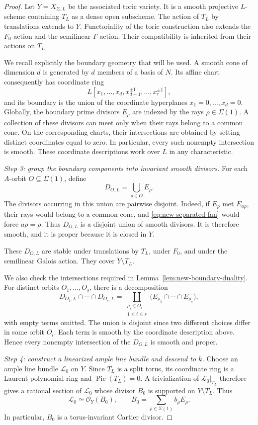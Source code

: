 \documentclass[11pt,reqno]{amsart}
\theoremstyle{definition}
\theoremstyle{remark}
\theoremstyle{plain}
\numberwithin{equation}{section}
\begin{document}
\begin{proof}
Let \(Y=X_{\Sigma,L}\) be the associated toric variety.
It is a smooth projective \(L\)-scheme containing \(T_L\) as
a dense open subscheme.
The action of \(T_L\) by translations extends to \(Y\).
Functoriality of the toric construction also extends the
\(F_0\)-action and the semilinear \(\Gamma\)-action.
Their compatibility is inherited from their actions on \(T_L\).

We recall explicitly the boundary geometry that will be used.
A smooth cone of dimension \(d\) is generated by \(d\) members
of a basis of \(N\).
Its affine chart consequently has coordinate ring
\[
 L[x_1,\ldots,x_d,x_{d+1}^{\pm1},\ldots,x_r^{\pm1}],
\]
and its boundary is the union of the coordinate hyperplanes
\(x_1=0,\ldots,x_d=0\).
Globally, the boundary prime divisors \(E_\rho\) are indexed
by the rays \(\rho\in\Sigma(1)\).
A collection of these divisors can meet only when their rays
belong to a common cone.
On the corresponding charts, their intersections are obtained
by setting distinct coordinates equal to zero.
In particular, every such nonempty intersection is smooth.
These coordinate descriptions work over \(L\) in any
characteristic.

\smallskip
\noindent\emph{Step 3: group the boundary components into invariant
smooth divisors.}
For each \(A\)-orbit \(O\subseteq\Sigma(1)\), define
\[
 D_{O,L}=\bigcup_{\rho\in O}E_\rho.
\]
The divisors occurring in this union are pairwise disjoint.
Indeed, if \(E_\rho\) met \(E_{a\rho}\), their rays would belong
to a common cone, and \eqref{eq:new-separated-fan} would force
\(a\rho=\rho\).
Thus \(D_{O,L}\) is a disjoint union of smooth divisors.
It is therefore smooth, and it is proper because it is closed
in \(Y\).

These \(D_{O,L}\) are stable under translations by \(T_L\),
under \(F_0\), and under the semilinear Galois action.
They cover \(Y\setminus T_L\).

We also check the intersections required in
Lemma~\ref{lem:new-boundary-duality}.
For distinct orbits \(O_1,\ldots,O_s\), there is a decomposition
\[
 D_{O_1,L}\cap\cdots\cap D_{O_s,L}
 =
 \coprod_{\substack{\rho_i\in O_i\\1\leq i\leq s}}
 \bigl(E_{\rho_1}\cap\cdots\cap E_{\rho_s}\bigr),
\]
with empty terms omitted.
The union is disjoint since two different choices differ in some
orbit \(O_i\).
Each term is smooth by the coordinate description above.
Hence every nonempty intersection of the \(D_{O,L}\) is
smooth and proper.

\smallskip
\noindent\emph{Step 4: construct a linearized ample line bundle
and descend to \(k\).}
Choose an ample line bundle \(\mathcal L_0\) on \(Y\).
Since \(T_L\) is a split torus, its coordinate ring is a
Laurent polynomial ring and \(\operatorname{Pic}(T_L)=0\).
A trivialization of \(\mathcal L_0|_{T_L}\) therefore gives
a rational section of \(\mathcal L_0\) whose divisor \(B_0\)
is supported on \(Y\setminus T_L\).
Thus
\[
 \mathcal L_0\simeq\mathcal O_Y(B_0),
 \qquad
 B_0=\sum_{\rho\in\Sigma(1)}b_\rho E_\rho.
\]
In particular, \(B_0\) is a torus-invariant Cartier divisor.


\end{proof}
\end{document}
